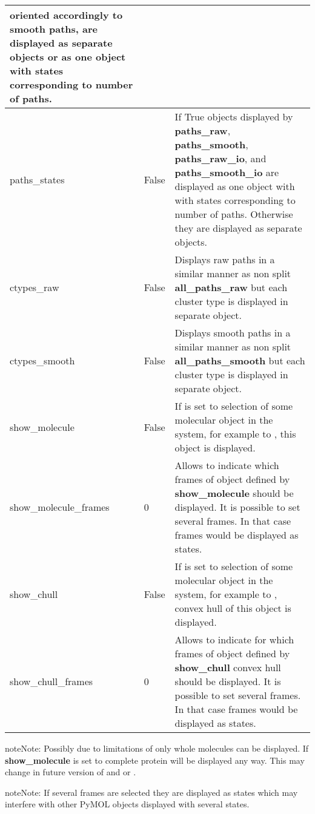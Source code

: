 \documentclass[a4paper,10pt,english]{sphinxmanual}
\begin{document}
\begin{tabulary}{\linewidth}{|L|L|L|}
oriented accordingly to smooth paths, are displayed as separate
objects or as one object with states corresponding to number
of paths.
\\
\hline
paths\_states
 & 
False
 & 
If True objects displayed by \textbf{paths\_raw}, \textbf{paths\_smooth},
\textbf{paths\_raw\_io}, and \textbf{paths\_smooth\_io} are displayed as one
object with with states corresponding to number of paths.
Otherwise they are displayed as separate objects.
\\
\hline
ctypes\_raw
 & 
False
 & 
Displays raw paths in a similar manner as non split
\textbf{all\_paths\_raw} but each cluster type is displayed in
separate object.
\\
\hline
ctypes\_smooth
 & 
False
 & 
Displays smooth paths in a similar manner as non split
\textbf{all\_paths\_smooth} but each cluster type is displayed in
separate object.
\\
\hline
show\_molecule
 & 
False
 & 
If is set to selection of some molecular object in the system,
for example to , this object is displayed.
\\
\hline
show\_molecule\_frames
 & 
0
 & 
Allows to indicate which frames of object defined by
\textbf{show\_molecule} should be displayed. It is possible to set
several frames. In that case frames would be displayed as
states.
\\
\hline
show\_chull
 & 
False
 & 
If is set to selection of some molecular object in the system,
for example to , convex hull of this object is
displayed.
\\
\hline
show\_chull\_frames
 & 
0
 & 
Allows to indicate for which frames of object defined by
\textbf{show\_chull} convex hull should be displayed. It is possible
to set several frames. In that case frames would be displayed
as states.
\\
\hline\end{tabulary}


\begin{notice}{note}{Note:}
Possibly due to limitations of  only whole molecules can be displayed. If \textbf{show\_molecule} is set to  complete protein will be displayed any way. This may change in future version of  and or {\hyperref[aqueduct:module\string-aqueduct]{}}.
\end{notice}

\begin{notice}{note}{Note:}
If several frames are selected they are displayed as states which may interfere with other PyMOL objects displayed with several states.
\end{notice}
\end{document}
